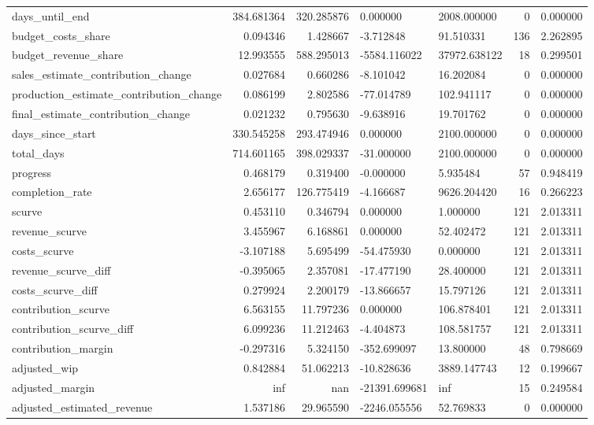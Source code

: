 \begin{landscape}
\begin{longtable}[h!]{lrrllrr}
days_until_end & 384.681364 & 320.285876 & 0.000000 & 2008.000000 & 0 & 0.000000 \\
budget_costs_share & 0.094346 & 1.428667 & -3.712848 & 91.510331 & 136 & 2.262895 \\
budget_revenue_share & 12.993555 & 588.295013 & -5584.116022 & 37972.638122 & 18 & 0.299501 \\
sales_estimate_contribution_change & 0.027684 & 0.660286 & -8.101042 & 16.202084 & 0 & 0.000000 \\
production_estimate_contribution_change & 0.086199 & 2.802586 & -77.014789 & 102.941117 & 0 & 0.000000 \\
final_estimate_contribution_change & 0.021232 & 0.795630 & -9.638916 & 19.701762 & 0 & 0.000000 \\
days_since_start & 330.545258 & 293.474946 & 0.000000 & 2100.000000 & 0 & 0.000000 \\
total_days & 714.601165 & 398.029337 & -31.000000 & 2100.000000 & 0 & 0.000000 \\
progress & 0.468179 & 0.319400 & -0.000000 & 5.935484 & 57 & 0.948419 \\
completion_rate & 2.656177 & 126.775419 & -4.166687 & 9626.204420 & 16 & 0.266223 \\
scurve & 0.453110 & 0.346794 & 0.000000 & 1.000000 & 121 & 2.013311 \\
revenue_scurve & 3.455967 & 6.168861 & 0.000000 & 52.402472 & 121 & 2.013311 \\
costs_scurve & -3.107188 & 5.695499 & -54.475930 & 0.000000 & 121 & 2.013311 \\
revenue_scurve_diff & -0.395065 & 2.357081 & -17.477190 & 28.400000 & 121 & 2.013311 \\
costs_scurve_diff & 0.279924 & 2.200179 & -13.866657 & 15.797126 & 121 & 2.013311 \\
contribution_scurve & 6.563155 & 11.797236 & 0.000000 & 106.878401 & 121 & 2.013311 \\
contribution_scurve_diff & 6.099236 & 11.212463 & -4.404873 & 108.581757 & 121 & 2.013311 \\
contribution_margin & -0.297316 & 5.324150 & -352.699097 & 13.800000 & 48 & 0.798669 \\
adjusted_wip & 0.842884 & 51.062213 & -10.828636 & 3889.147743 & 12 & 0.199667 \\
adjusted_margin & inf & nan & -21391.699681 & inf & 15 & 0.249584 \\
adjusted_estimated_revenue & 1.537186 & 29.965590 & -2246.055556 & 52.769833 & 0 & 0.000000 \\

\end{longtable}
\end{landscape}
